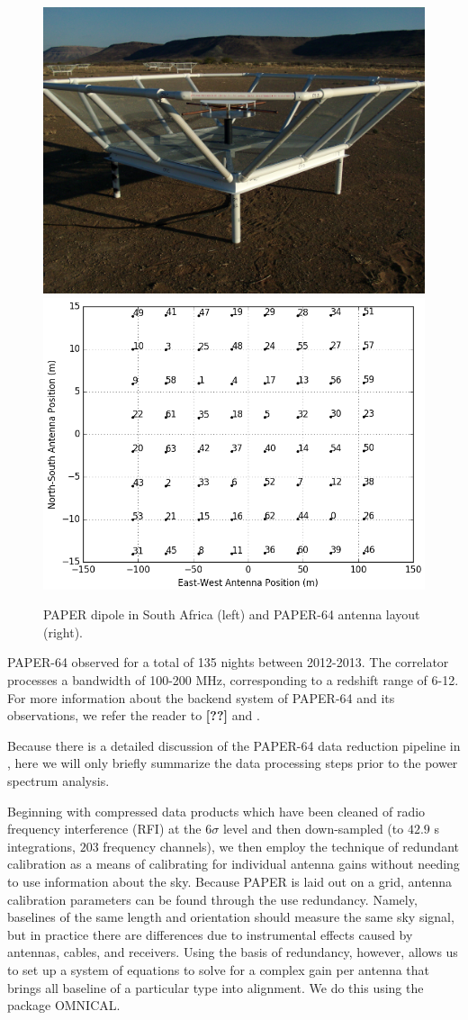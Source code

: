 \documentclass[preprint2,numberedappendix,tighten,twocolappendix]{aastex6}  %
\newcommand{\cc}[1]{{\color{purple} \textbf{[#1]}}}
\begin{document}
\begin{figure}
	\centering
	\includegraphics[height=0.35\textwidth]{paper_dipole.png}
	\includegraphics[height=0.35\textwidth]{antenna_layout.png}
	\caption{PAPER dipole in South Africa (left) and PAPER-64 antenna layout (right).}
	\label{fig:paper}
\end{figure}

PAPER-64 observed for a total of 135 nights between 2012-2013. The correlator processes a bandwidth of 100-200 MHz, corresponding to a redshift range of 6-12. For more information about the backend system of PAPER-64 and its observations, we refer the reader to \cc{??} and \citet{ali_et_al2015}.

Because there is a detailed discussion of the PAPER-64 data reduction pipeline in \citet{ali_et_al2015}, here we will only briefly summarize the data processing steps prior to the power spectrum analysis. 

Beginning with compressed data products which have been cleaned of radio frequency interference (RFI) at the $6\sigma$ level and then down-sampled (to $42.9$ s integrations, $203$ frequency channels), we then employ the technique of redundant calibration as a means of calibrating for individual antenna gains without needing to use information about the sky. Because PAPER is laid out on a grid, antenna calibration parameters can be found through the use redundancy. Namely, baselines of the same length and orientation should measure the same sky signal, but in practice there are differences due to instrumental effects caused by antennas, cables, and receivers. Using the basis of redundancy, however, allows us to set up a system of equations to solve for a complex gain per antenna that brings all baseline of a particular type into alignment. We do this using the package OMNICAL.
\end{document}
